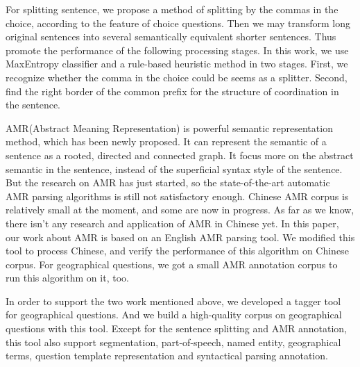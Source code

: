 \documentclass[master, winfont]{njuthesis}
\begin{document}
\begin{englishabstract}
For splitting sentence, we propose a method of splitting by the commas in the choice, according to the feature of choice questions. Then we may transform long original sentences into several semantically equivalent shorter sentences. Thus promote the performance of the following processing stages. In this work, we use MaxEntropy classifier and a rule-based heuristic method in two stages. First, we recognize whether the comma in the choice could be seems as a splitter. Second, find the right border of the common prefix for the structure of coordination in the sentence.

AMR(Abstract Meaning Representation) is powerful semantic representation method, which has been newly proposed. It can represent the semantic of a sentence as a rooted, directed and connected graph. It focus more on the abstract semantic in the sentence, instead of the superficial syntax style  of the sentence. But the research on AMR has just started, so the state-of-the-art automatic AMR parsing algorithms is still not satisfactory enough. Chinese AMR corpus is relatively small at the moment, and some are now in progress. As far as we know, there isn't any research and application of AMR in Chinese yet. In this paper, our work about AMR is based on an English AMR parsing tool. We modified this tool to process Chinese, and verify the performance of this algorithm on Chinese corpus. For geographical questions, we got a small AMR annotation corpus to run this algorithm on it, too.

In order to support the two work mentioned above, we developed a tagger tool for geographical questions. And we build a high-quality corpus on geographical questions with this tool. Except for the sentence splitting and AMR annotation, this tool also support segmentation, part-of-speech, named entity, geographical terms, question template representation and syntactical parsing annotation.

\end{englishabstract}

%
%
\end{document}

